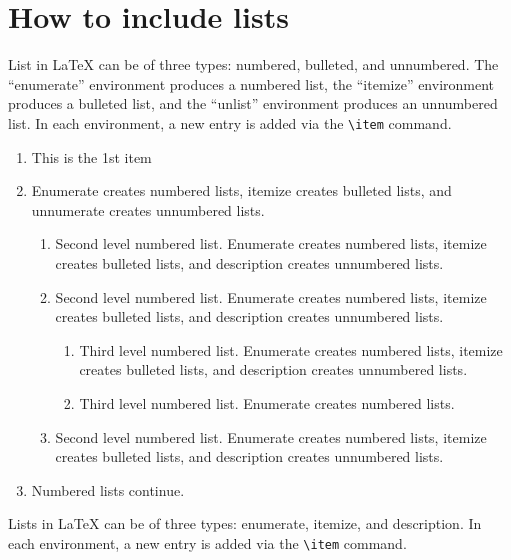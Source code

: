 \documentclass[12pt,a4paper]{article}
\begin{document}
\section{How to include lists}\label{sec7}

List in \LaTeX{} can be of three types: numbered, bulleted, and unnumbered. The ``enumerate'' environment produces a numbered list, the 
``itemize'' environment produces a bulleted list, and the ``unlist''
environment produces an unnumbered list.
In each environment, a new entry is added via the \verb+\item+ command.

\begin{enumerate}[label=\arabic*.]
\item This is the 1st item
\item Enumerate creates numbered lists, itemize creates bulleted lists, and unnumerate creates unnumbered lists.

\begin{enumerate}[label=\alph*.]
\item Second level numbered list. Enumerate creates numbered lists, itemize creates bulleted lists, and description creates unnumbered lists.
\item Second level numbered list. Enumerate creates numbered lists, itemize creates bulleted lists, and description creates unnumbered lists.

\begin{enumerate}[label=(\roman*)]
\item Third level numbered list. Enumerate creates numbered lists, itemize creates bulleted lists, and description creates unnumbered lists.
\item Third level numbered list. Enumerate creates numbered lists.
\end{enumerate}

\item Second level numbered list. Enumerate creates numbered lists, itemize creates bulleted lists, and description creates unnumbered lists.
\end{enumerate}

\item Numbered lists continue.
\end{enumerate}
Lists in \LaTeX{} can be of three types: enumerate, itemize, and description.
In each environment, a new entry is added via the \verb+\item+ command.
\end{document}
